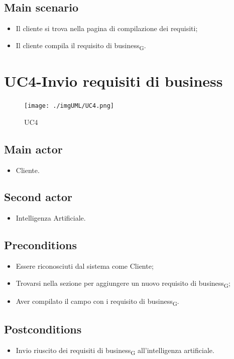 \documentclass{article}
\begin{document}
     \subsection*{Main scenario}

        \begin{itemize}
            \item Il cliente si trova nella pagina di compilazione dei requisiti;
            \item Il cliente compila il requisito di business\textsubscript{G}.
        \end{itemize}
    
\section{UC4-Invio requisiti di business}
    \begin{figure}[H]
      \centering
      \texttt{[image: ./imgUML/UC4.png]}
            \caption{UC4}
      \label{fig:UC4}
    \end{figure}
     \subsection*{Main actor}
     \begin{itemize}
         \item Cliente.
     \end{itemize}
      \subsection*{Second actor}
     \begin{itemize}
         \item Intelligenza Artificiale.
     \end{itemize}
     \subsection*{Preconditions} 
     \begin{itemize}
         \item Essere riconosciuti dal sistema come Cliente;
         \item Trovarsi nella sezione per aggiungere un nuovo requisito di business\textsubscript{G};
         \item Aver compilato il campo con i requisito di business\textsubscript{G}.
     \end{itemize}
     \subsection*{Postconditions} 
        \begin{itemize}
            \item Invio riuscito dei requisiti di business\textsubscript{G} all'intelligenza artificiale.
        \end{itemize}
        
\end{document}
